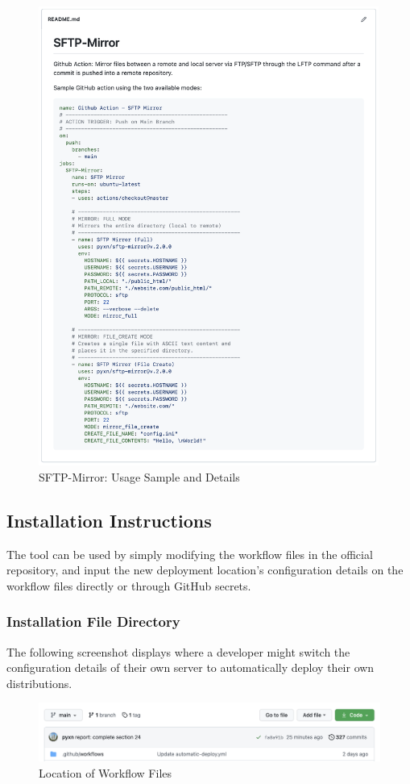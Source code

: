 \documentclass[12pt, letterpaper]{article}
\begin{document}
\begin{figure}[htbp]
	\centering
	\includegraphics[width=4.4in]{images/25-sftp-mirror-usage.png}
	\caption{SFTP-Mirror: Usage Sample and Details}
 \end{figure}

\newpage
\subsection*{Installation Instructions}
The tool can be used by simply modifying the workflow files in the official repository, and input the new deployment location's configuration details on the workflow files directly or through GitHub secrets.

\subsubsection*{Installation File Directory}
The following screenshot displays where a developer might switch the configuration details of their own server to automatically deploy their own distributions.

\begin{figure}[htbp]
	\centering
	\includegraphics[width=\textwidth]{images/25-workflows.png}
	\caption{Location of Workflow Files}
 \end{figure}
\end{document}
